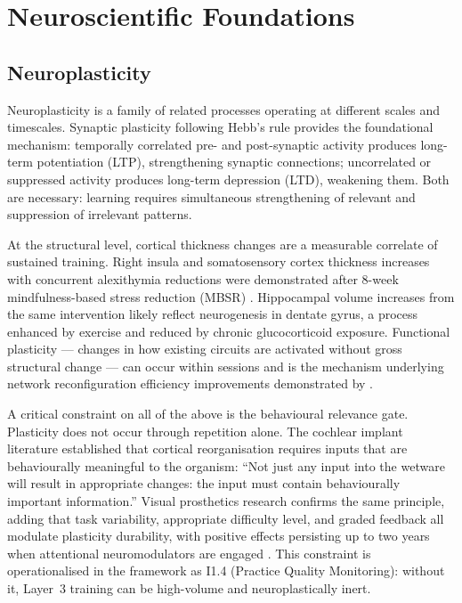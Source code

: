 \documentclass[12pt, a4paper]{article}
\begin{document}
\section{Neuroscientific Foundations}

\subsection{Neuroplasticity}

Neuroplasticity is a family of related processes operating at different scales and
timescales. Synaptic plasticity following Hebb's rule \citep{hebb1949} provides the
foundational mechanism: temporally correlated pre- and post-synaptic activity
produces long-term potentiation (LTP), strengthening synaptic connections;
uncorrelated or suppressed activity produces long-term depression (LTD), weakening
them. Both are necessary: learning requires simultaneous strengthening of relevant
and suppression of irrelevant patterns.

At the structural level, cortical thickness changes are a measurable correlate of
sustained training. Right insula and somatosensory cortex thickness increases with
concurrent alexithymia reductions were demonstrated after 8-week mindfulness-based
stress reduction (MBSR) \citep{calderone2024}. Hippocampal volume increases from
the same intervention likely reflect neurogenesis in dentate gyrus, a process
enhanced by exercise and reduced by chronic glucocorticoid exposure. Functional
plasticity --- changes in how existing circuits are activated without gross structural
change --- can occur within sessions and is the mechanism underlying network
reconfiguration efficiency improvements demonstrated by \citet{yue2023}.

A critical constraint on all of the above is the behavioural relevance gate.
Plasticity does not occur through repetition alone. The cochlear implant literature
\citep{fallon2009} established that cortical reorganisation requires inputs that are
behaviourally meaningful to the organism: ``Not just any input into the wetware will
result in appropriate changes: the input must contain behaviourally important
information.'' Visual prosthetics research confirms the same principle, adding that
task variability, appropriate difficulty level, and graded feedback all modulate
plasticity durability, with positive effects persisting up to two years when
attentional neuromodulators are engaged \citep{beyeler2017}. This constraint is
operationalised in the framework as I1.4 (Practice Quality Monitoring): without it,
Layer~3 training can be high-volume and neuroplastically inert.
\end{document}
